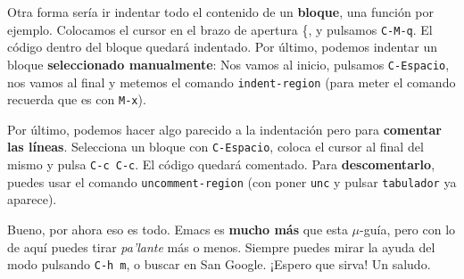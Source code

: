 \documentclass[landscape]{article}
\begin{document}
\begin{multicols*}{2}
Otra forma sería ir indentar todo el contenido de un \textbf{bloque}, una función por ejemplo. Colocamos el cursor en el brazo de apertura \{, y pulsamos \texttt{C-M-q}. El código dentro del bloque quedará indentado. Por último, podemos indentar un bloque \textbf{seleccionado manualmente}: Nos vamos al inicio, pulsamos \texttt{C-Espacio}, nos vamos al final y metemos el comando \texttt{indent-region} (para meter el comando recuerda que es con \texttt{M-x}).

Por último, podemos hacer algo parecido a la indentación pero para \textbf{comentar las líneas}. Selecciona un bloque con \texttt{C-Espacio}, coloca el cursor al final del mismo y pulsa \texttt{C-c C-c}. El código quedará comentado. Para \textbf{descomentarlo}, puedes usar el comando \texttt{uncomment-region} (con poner \texttt{unc} y pulsar \texttt{tabulador} ya aparece).

Bueno, por ahora eso es todo. Emacs es \textbf{mucho más} que esta $\mu$-guía, pero con lo de aquí puedes tirar \textit{pa'lante} más o menos. Siempre puedes mirar la ayuda del modo pulsando \texttt{C-h m}, o buscar en San Google. ¡Espero que sirva! Un saludo.
\end{multicols*}
\end{document}
